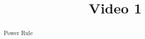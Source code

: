 \documentclass[handout]{ximera}
\title{Video 1}
\begin{document}
\begin{abstract}
Power Rule
\end{abstract}

\maketitle

\end{document}
